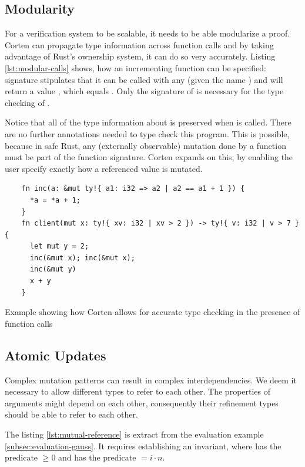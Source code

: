 \documentclass[twoside, english]{sdqthesis}
\theoremstyle{definition}
\begin{document}
\label{sec:modularity}\subsection{Modularity}

For a verification system to be scalable, it needs to be able modularize a proof. Corten can propagate type information across function calls and by taking advantage of Rust's ownership system, it can do so very accurately. Listing \ref{lst:modular-calls} shows, how an incrementing function  can be specified:  signature stipulates that it can be called with any  (given the name ) and will return a value , which equals . Only the signature of  is necessary for the type checking of . 

Notice that all of the type information about  is preserved when  is called. There are no further annotations needed to type check this program. This is possible, because in safe Rust, any (externally observable) mutation done by a function must be part of the function signature. Corten expands on this, by enabling the user specify exactly how a referenced value is mutated.

\begin{listing}[ht]
  \begin{verbatim}
    fn inc(a: &mut ty!{ a1: i32 => a2 | a2 == a1 + 1 }) {
      *a = *a + 1;
    }
    fn client(mut x: ty!{ xv: i32 | xv > 2 }) -> ty!{ v: i32 | v > 7 } {
      let mut y = 2;
      inc(&mut x); inc(&mut x);
      inc(&mut y)
      x + y
    }
  \end{verbatim}
  \caption{Example showing how Corten allows for accurate type checking in the presence of function calls }
  \label{lst:modular-calls}
\end{listing}




\subsection{Atomic Updates}\label{subsec:atomic-updates}

Complex mutation patterns can result in complex interdependencies. We deem it necessary to allow different types to refer to each other. 
The properties of arguments might depend on each other, consequently their refinement types should be able to refer to each other.

The listing \ref{lst:mutual-reference} is extract from the evaluation example \ref{subsec:evaluation-gauss}. It requires establishing an invariant, where  has the predicate $\geq 0$ and  has the predicate $= i \cdot n$.
\end{document}
